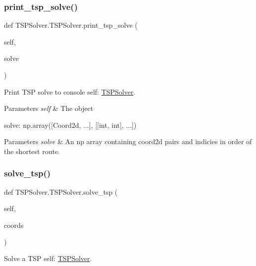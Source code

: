 \subsubsection{\texorpdfstring{print\+\_\+tsp\+\_\+solve()}{print\_tsp\_solve()}}
{\footnotesize\ttfamily def T\+S\+P\+Solver.\+T\+S\+P\+Solver.\+print\+\_\+tsp\+\_\+solve (\begin{DoxyParamCaption}\item[{}]{self,  }\item[{}]{solve }\end{DoxyParamCaption})}



Print T\+SP solve to console  self\+: \hyperlink{classTSPSolver_1_1TSPSolver}{T\+S\+P\+Solver}. 


\begin{DoxyParams}{Parameters}
{\em self} & The object\\
\hline
\end{DoxyParams}
solve\+: np.\+array(\mbox{[}Coord2d, ...\mbox{]}, \mbox{[}\mbox{[}int, int\mbox{]}, ...\mbox{]}) 
\begin{DoxyParams}{Parameters}
{\em solve} & An np array containing coord2d pairs and indicies in order of the shortest route. \\
\hline
\end{DoxyParams}
\mbox{\label{classTSPSolver_1_1TSPSolver_a0f5c8546f937bcf4c58e523ac65a39a8}} 
\subsubsection{\texorpdfstring{solve\+\_\+tsp()}{solve\_tsp()}}
{\footnotesize\ttfamily def T\+S\+P\+Solver.\+T\+S\+P\+Solver.\+solve\+\_\+tsp (\begin{DoxyParamCaption}\item[{}]{self,  }\item[{}]{coords }\end{DoxyParamCaption})}



Solve a T\+SP  self\+: \hyperlink{classTSPSolver_1_1TSPSolver}{T\+S\+P\+Solver}. 


